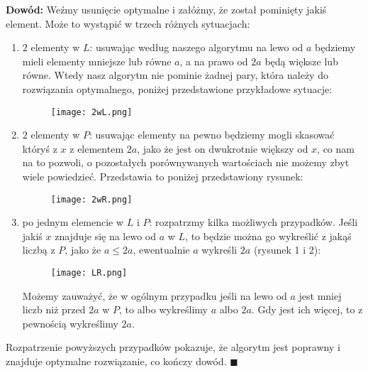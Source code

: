 \documentclass[a4paper,12pt]{article}
\begin{document}
\noindent \textbf{Dowód:} Weźmy usunięcie optymalne i załóżmy, że został pominięty jakiś element. Może to wystąpić w trzech różnych sytuacjach:
\begin{enumerate}
\item $2$ elementy w $L$: usuwając według naszego algorytmu na lewo od $a$ będziemy mieli elementy mniejsze lub równe $a$, a na prawo od $2a$ będą większe lub równe. Wtedy nasz algorytm nie pominie żadnej pary, która należy do rozwiązania optymalnego, poniżej przedstawione przykładowe sytuacje:
\begin{figure}[H]
\centering
\texttt{[image: 2wL.png]}
\end{figure}

\item $2$ elementy w $P$: usuwając elementy na pewno będziemy mogli skasować któryś z $x$ z elementem $2a$, jako że jest on dwukrotnie większy od $x$, co nam na to pozwoli, o pozostałych porównywanych wartościach nie możemy zbyt wiele powiedzieć. Przedstawia to poniżej przedstawiony rysunek:
\begin{figure}[H]
\centering
\texttt{[image: 2wR.png]}
\end{figure}

\item po jednym elemencie w $L$ i $P$: rozpatrzmy kilka możliwych przypadków. Jeśli jakiś $x$ znajduje się na lewo od $a$ w $L$, to będzie można go wykreślić z jakąś liczbą z $P$, jako że $a \leq 2a$, ewentualnie $a$ wykreśli $2a$ (rysunek 1 i 2):
\begin{figure}[H]
\centering
\texttt{[image: LR.png]}
\end{figure}
Możemy zauważyć, że w ogólnym przypadku jeśli na lewo od $a$ jest mniej liczb niż przed $2a$ w $P$, to albo wykreślimy $a$ albo $2a$. Gdy jest ich więcej, to z pewnością wykreślimy $2a$.
\end{enumerate}
Rozpatrzenie powyższych przypadków pokazuje, że algorytm jest poprawny i znajduje optymalne rozwiązanie, co kończy dowód. $\blacksquare$
\end{document}
